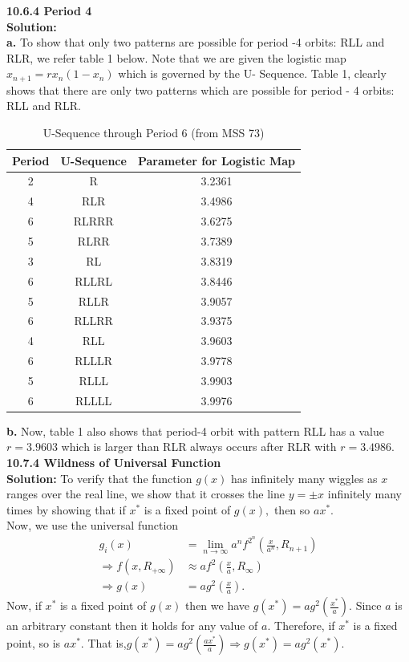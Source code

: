 \documentclass[12pt]{article}
\newcommand{\mycbox}[1]{\tikz{\path[draw=#1,fill=#1] (0,0) rectangle (.2cm,.2cm);}}
\begin{document}
	\bigskip\noindent
	{\bf 10.6.4 Period 4}\\
	{\bf Solution: }\\
	{\bf a. } To show that only two patterns are possible for period -4 orbits: RLL and RLR, we refer table 1 below. Note that we are given the logistic map $x_{n+1}=rx_n(1-x_n)$ which is governed by the U- Sequence. Table 1, clearly shows that there are only two patterns which are possible for period - 4 orbits: RLL and RLR.
	\begin{table}[h!]
		\centering
		\caption{U-Sequence through Period 6 (from MSS 73)}
		\label{tab:table1}
		\begin{tabular}{ccc}
			\toprule
			Period & U-Sequence & Parameter for Logistic Map\\
			\midrule
			2 & R & 3.2361\\
			4 & RLR & 3.4986\\
			6 & RLRRR & 3.6275\\
			5 & RLRR & 3.7389\\
			3 & RL & 3.8319\\
			6 & RLLRL & 3.8446\\
			5 & RLLR & 3.9057\\
			6 & RLLRR & 3.9375\\
			4 & RLL & 3.9603\\
			6 & RLLLR & 3.9778\\
			5 & RLLL & 3.9903\\
			6 & RLLLL & 3.9976\\
			\bottomrule
		\end{tabular}
	\end{table}
	
	{\bf b. } Now, table 1 also shows that period-4 orbit with pattern RLL has a value $r=3.9603$ which is larger than RLR always occurs after RLR with $r=3.4986.$\\
	
	
	\noindent
	{\bf 10.7.4 Wildness of Universal Function }\\
	{\bf Solution: } To verify that the function $g(x)$ has infinitely many wiggles as $x$ ranges over the real line, we show that it crosses the line $y=\pm x$ infinitely many times by showing that if $x^*$ is a fixed point of $g(x),$ then so $ax^*.$\\  
	Now, we use the universal function
	\begin{align*}
	g_i(x)&=\lim_{n\to\infty} a^n f^{2^n}\left(\frac{x}{a^n}, R_{n+1}\right)\\
	\Rightarrow f\left(x,R_{+\infty}\right)&\approx a f^2\left(\frac{x}{a}, R_{\infty}\right)\\
	\Rightarrow g(x)&=ag^2\left(\frac{x}{a}\right).
	\end{align*} 
	Now, if $x^*$ is a fixed point of $g(x)$ then we have $g(x^*)=ag^2\left(\frac{x^*}{a}\right).$ Since $a$ is an arbitrary constant then it holds for any value of $a.$ Therefore, if $x^*$ is a fixed point, so is $ax^*.$ That is,$g(x^*)=ag^2\left(\frac{ax^*}{a}\right)\Rightarrow g(x^*)=ag^2\left(x^*\right)$. \mycbox{black}
	
	
\end{document}
